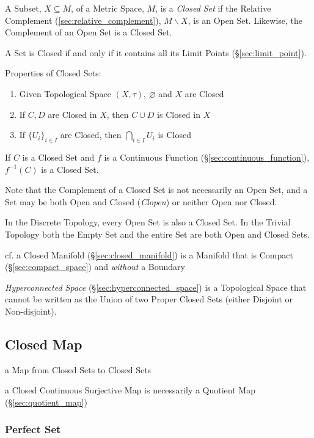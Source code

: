 A Subset, $X \subseteq M$, of a Metric Space, $M$, is a \emph{Closed
  Set} if the Relative Complement (\ref{sec:relative_complement}), $M
\backslash X$, is an Open Set. Likewise, the Complement of an Open Set
is a Closed Set.

A Set is Closed if and only if it contains all its Limit Points
(\S\ref{sec:limit_point}).

Properties of Closed Sets:
\begin{enumerate}
  \item Given Topological Space $(X, \tau)$, $\varnothing$ and $X$ are
    Closed
  \item If $C, D$ are Closed in $X$, then $C \cup D$ is Closed in $X$
  \item If $\{ U_i \}_{i \in I}$ are Closed, then $\bigcap_{i \in I}
  U_i$ is Closed
\end{enumerate}

If $C$ is a Closed Set and $f$ is a Continuous Function
(\S\ref{sec:continuous_function}), $f^{-1}(C)$ is a Closed Set.

\fist Note that the Complement of a Closed Set is not
necessarily an Open Set, and a Set may be both Open and Closed
(\emph{Clopen}) or neither Open nor Closed.

In the Discrete Topology, every Open Set is also a Closed Set. In the
Trivial Topology both the Empty Set and the entire Set are both Open
and Closed Sets.

\fist cf. a Closed Manifold (\S\ref{sec:closed_manifold}) is a Manifold that is
Compact (\S\ref{sec:compact_space}) and \emph{without} a Boundary

\fist \emph{Hyperconnected Space} (\S\ref{sec:hyperconnected_space}) is a
Topological Space that cannot be written as the Union of two Proper Closed Sets
(either Disjoint or Non-disjoint).



\subsection{Closed Map}\label{sec:closed_map}

a Map from Closed Sets to Closed Sets

a Closed Continuous Surjective Map is necessarily a Quotient Map
(\S\ref{sec:quotient_map})



\subsubsection{Perfect Set}\label{sec:perfect_set}

